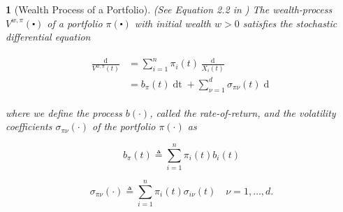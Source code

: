 \documentclass[british]{amsart} \usepackage{lmodern}
\numberwithin{equation}{section} \numberwithin{figure}{section}
\theoremstyle{plain} \newtheorem{thm}{\protect\theoremname}[section]
\theoremstyle{definition} \newtheorem{defn}[thm]{\protect\definitionname}
\theoremstyle{plain} \newtheorem{assumption}[thm]{\protect\assumptionname}
\theoremstyle{plain} \newtheorem{lem}[thm]{\protect\lemmaname}
\theoremstyle{plain} \newtheorem{prop}[thm]{\protect\propositionname}
\theoremstyle{remark} \newtheorem{rem}[thm]{\protect\remarkname}
\theoremstyle{plain} \newtheorem{cor}[thm]{\protect\corollaryname}
\renewcommand{\d}[1]{\mathop{\mathrm{d}{#1}}}
\newcommand{\defeq}{\mathop{\triangleq}} \newcommand{\almostsurely}{\text{a.s.}}
\begin{document}
\begin{prop} [Wealth Process of a Portfolio]
  (See Equation 2.2 in \cite{fernholz2009})
  The wealth-process $V^{w,\pi}(\centerdot)$ of a portfolio $\pi(\centerdot)$
  with initial wealth $w > 0$ satisfies the stochastic differential equation

  \begin{gather}
    \label{eq:arithmeticreturnofportfolio}
    \begin{split}
      \frac{\d{V^{w,\pi}(t)}}{V^{w,\pi}(t)} 
        &= \sum_{i=1}^{n} \pi_{i}(t) \frac{\d{X_{i}(t)}}{X_{i}(t)} \\
        &= b_{\pi}(t)\d{t} + \sum_{\nu=1}^{d} \sigma_{\pi\nu}(t) \d{W_{\nu}(t)}
    \end{split}
  \end{gather}

  where we define the process $b(\cdot)$, called the \textit{rate-of-return}, and the
  volatility coefficients $\sigma_{\pi\nu}(\cdot)$ of the portfolio $\pi(\cdot)$ 
  as

  \begin{equation}
    \label{eq:wealthprocessrateofreturn}
    b_{\pi}(t) \defeq \sum_{i=1}^{n} \pi_{i}(t) b_{i}(t)
  \end{equation}

  \begin{equation}
    \label{eq:wealthprocessvolatility}
    \sigma_{\pi\nu}(\cdot) \defeq \sum_{i=1}^{n} \pi_{i}(t) \sigma_{i\nu}(t)
    \quad \nu=1,\dots,d.
  \end{equation}

\end{prop}
\end{document}
